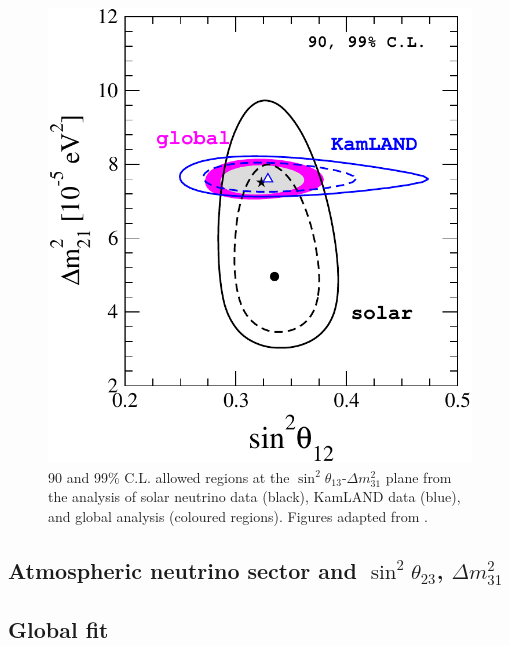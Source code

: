 \documentclass[english]{article}
\begin{document}
    \begin{figure}[!hbt]
		\begin{center}
        \centering
        \captionsetup{justification=centering}
		\includegraphics[scale=0.5]{sol-sector-sq12-mq21.pdf}
		\caption{90 and 99\% C.L. allowed regions at the $\sin^{2}{\theta_{13}}$-$\Delta{m^{2}_{31}}$ plane from the analysis of solar neutrino data (black), KamLAND data (blue), and global analysis (coloured regions). Figures adapted from \cite{salas2018}.}
		\label{fig:sol-sector-sq12-mq21}
		\end{center}
	\end{figure}

\subsection{Atmospheric neutrino sector and $\sin^{2}{\theta_{23}}$, $\Delta{m^{2}_{31}}$}

\subsection{Global fit}
\end{document}
